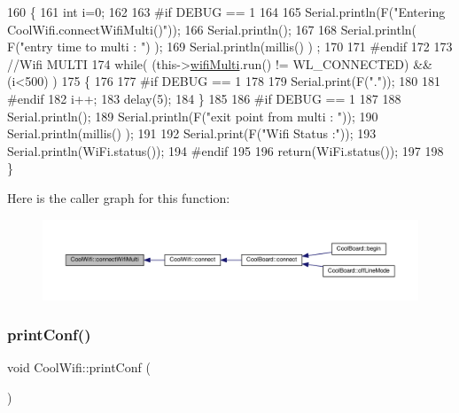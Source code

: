 \begin{DoxyCode}
160 \{
161     \textcolor{keywordtype}{int} i=0;
162 
163 \textcolor{preprocessor}{#if DEBUG == 1 }
164 
165     Serial.println(F(\textcolor{stringliteral}{"Entering CoolWifi.connectWifiMulti()"}));
166     Serial.println();
167     
168     Serial.println( F(\textcolor{stringliteral}{"entry time to multi : "}) );
169     Serial.println(millis() ) ;
170 
171 \textcolor{preprocessor}{#endif}
172     
173     \textcolor{comment}{//Wifi MULTI}
174     \textcolor{keywordflow}{while}( (this->\hyperlink{class_cool_wifi_a7862a8c0d7239877e2956c14a368aab8}{wifiMulti}.run() != WL\_CONNECTED) && (i<500)  ) 
175     \{
176 
177 \textcolor{preprocessor}{    #if DEBUG == 1}
178 
179         Serial.print(F(\textcolor{stringliteral}{"."}));
180         
181 \textcolor{preprocessor}{    #endif}
182         i++;
183         delay(5);
184         \}   
185 
186 \textcolor{preprocessor}{#if DEBUG == 1 }
187 
188     Serial.println();   
189     Serial.println(F(\textcolor{stringliteral}{"exit point from multi : "}));
190     Serial.println(millis() );
191     
192     Serial.print(F(\textcolor{stringliteral}{"Wifi Status :"}));
193     Serial.println(WiFi.status());
194 \textcolor{preprocessor}{#endif}
195 
196     \textcolor{keywordflow}{return}(WiFi.status());
197 
198 \}
\end{DoxyCode}
Here is the caller graph for this function\+:\nopagebreak
\begin{figure}[H]
\begin{center}
\leavevmode
\includegraphics[width=350pt]{d7/d29/class_cool_wifi_a419de92d738f14b7444cf822b3ab0070_icgraph}
\end{center}
\end{figure}
\mbox{\label{class_cool_wifi_a9e6105c6d13d35ec510f6633da9e0223}} 
\subsubsection{\texorpdfstring{print\+Conf()}{printConf()}}
{\footnotesize\ttfamily void Cool\+Wifi\+::print\+Conf (\begin{DoxyParamCaption}{ }\end{DoxyParamCaption})}

